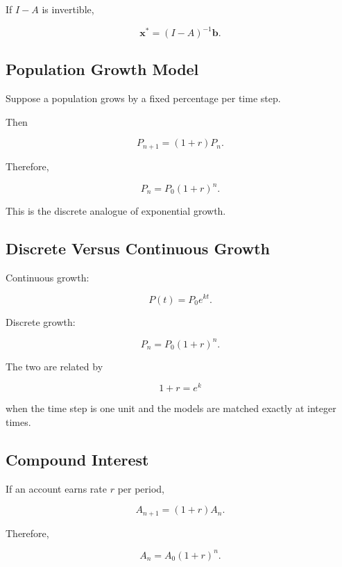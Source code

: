 If \(I-A\) is invertible,

\[
\boxed{
\mathbf{x}^*
=
(I-A)^{-1}\mathbf{b}.
}
\]

\subsection{Population Growth Model}
\label{subsec:discrete-population-growth}

Suppose a population grows by a fixed percentage per time step.

Then

\[
\boxed{
P_{n+1}
=
(1+r)P_n.
}
\]

Therefore,

\[
\boxed{
P_n
=
P_0(1+r)^n.
}
\]

This is the discrete analogue of exponential growth.

\subsection{Discrete Versus Continuous Growth}
\label{subsec:discrete-versus-continuous-growth}

Continuous growth:

\[
\boxed{
P(t)
=
P_0e^{kt}.
}
\]

Discrete growth:

\[
\boxed{
P_n
=
P_0(1+r)^n.
}
\]

The two are related by

\[
\boxed{
1+r=e^k
}
\]

when the time step is one unit and the models are matched exactly at
integer times.

\subsection{Compound Interest}
\label{subsec:difference-compound-interest}

If an account earns rate \(r\) per period,

\[
\boxed{
A_{n+1}
=
(1+r)A_n.
}
\]

Therefore,

\[
\boxed{
A_n
=
A_0(1+r)^n.
}
\]

